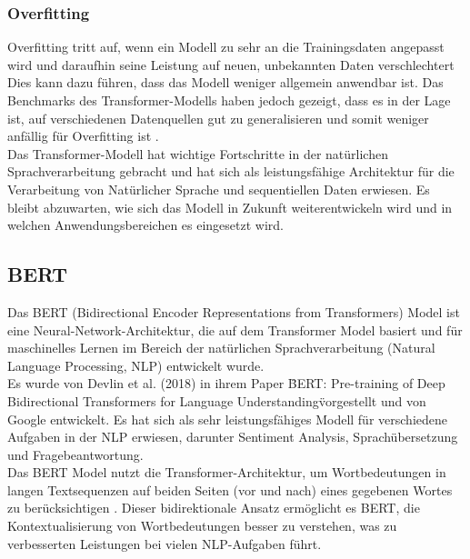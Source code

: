 \documentclass[oneside,bibliography=totocnumbered,BCOR=5mm]{scrbook}%
\theoremstyle{definition}
\theoremstyle{definition}
\theoremstyle{definition}
\theoremstyle{definition}
\theoremstyle{definition}
\theoremstyle{definition}
\begin{document}
\subsubsection{Overfitting}

Overfitting tritt auf, wenn ein Modell zu sehr an die Trainingsdaten angepasst wird und daraufhin seine Leistung auf neuen, 
unbekannten Daten verschlechtert \autocite[Seite 81]{MLgood2know}
Dies kann dazu führen, dass das Modell weniger allgemein anwendbar ist. 
Das Benchmarks des Transformer-Modells haben jedoch gezeigt, dass es in der Lage ist, auf verschiedenen Datenquellen gut zu generalisieren 
und somit weniger anfällig für Overfitting ist \autocite[Seite 9]{transformer}. \\


Das Transformer-Modell hat wichtige Fortschritte in der natürlichen Sprachverarbeitung gebracht 
und hat sich als leistungsfähige Architektur für die Verarbeitung von Natürlicher Sprache und sequentiellen Daten erwiesen. 
Es bleibt abzuwarten, wie sich das Modell in Zukunft weiterentwickeln wird und in welchen Anwendungsbereichen es eingesetzt wird. \\
\linebreak[4]


\subsection{BERT}


Das BERT (Bidirectional Encoder Representations from Transformers) Model ist eine Neural-Network-Architektur, 
die auf dem Transformer Model basiert und für maschinelles Lernen im Bereich der natürlichen 
Sprachverarbeitung (Natural Language Processing, NLP) entwickelt wurde. \\


Es wurde von Devlin et al. (2018) in ihrem Paper \"BERT: Pre-training of Deep Bidirectional Transformers for 
Language Understanding\" vorgestellt und von Google entwickelt. 
Es hat sich als sehr leistungsfähiges Modell für verschiedene Aufgaben in der NLP erwiesen, 
darunter Sentiment Analysis, Sprachübersetzung und Fragebeantwortung. \\


Das BERT Model nutzt die Transformer-Architektur, um Wortbedeutungen in langen Textsequenzen auf 
beiden Seiten (vor und nach) eines gegebenen Wortes zu berücksichtigen \autocite[Seite 5]{bert}. 
Dieser bidirektionale Ansatz ermöglicht es BERT, die Kontextualisierung von Wortbedeutungen besser zu verstehen, 
was zu verbesserten Leistungen bei vielen NLP-Aufgaben führt.  \\
\end{document}
